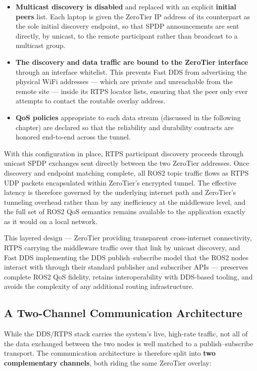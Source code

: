 \begin{itemize}
    \item \textbf{Multicast discovery is disabled} and replaced with an explicit \textbf{initial peers} list. Each laptop is given the ZeroTier IP address of its counterpart as the sole initial discovery endpoint, so that SPDP announcements are sent directly, by unicast, to the remote participant rather than broadcast to a multicast group.
    \item \textbf{The discovery and data traffic are bound to the ZeroTier interface} through an interface whitelist. This prevents Fast DDS from advertising the physical WiFi addresses --- which are private and unreachable from the remote site --- inside its RTPS locator lists, ensuring that the peer only ever attempts to contact the routable overlay address.
    \item \textbf{QoS policies} appropriate to each data stream (discussed in the following chapter) are declared so that the reliability and durability contracts are honored end-to-end across the tunnel.
\end{itemize}

With this configuration in place, RTPS participant discovery proceeds through unicast SPDP exchanges sent directly between the two ZeroTier addresses. Once discovery and endpoint matching complete, all ROS2 topic traffic flows as RTPS UDP packets encapsulated within ZeroTier's encrypted tunnel. The effective latency is therefore governed by the underlying internet path and ZeroTier's tunneling overhead rather than by any inefficiency at the middleware level, and the full set of ROS2 QoS semantics remains available to the application exactly as it would on a local network.

This layered design --- ZeroTier providing transparent cross-internet connectivity, RTPS carrying the middleware traffic over that link by unicast discovery, and Fast DDS implementing the DDS publish--subscribe model that the ROS2 nodes interact with through their standard publisher and subscriber APIs --- preserves complete ROS2 QoS fidelity, retains interoperability with DDS-based tooling, and avoids the complexity of any additional routing infrastructure.

\subsection{A Two-Channel Communication Architecture}\label{sec:two_channel}

While the DDS/RTPS stack carries the system's live, high-rate traffic, not all of the data exchanged between the two nodes is well matched to a publish--subscribe transport. The communication architecture is therefore split into \textbf{two complementary channels}, both riding the same ZeroTier overlay:

